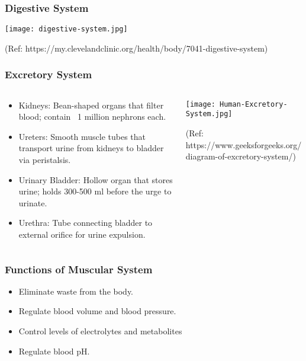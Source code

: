 \begin{frame}[fragile]\frametitle{Digestive System}

		\begin{center}
		\texttt{[image: digestive-system.jpg]}
		
		{\tiny (Ref: https://my.clevelandclinic.org/health/body/7041-digestive-system)}
		\end{center}	

\end{frame}

\begin{frame}[fragile]\frametitle{Excretory System}
\begin{columns}
    \begin{column}[T]{0.5\linewidth}
      \begin{itemize}
		\item Kidneys: Bean-shaped organs that filter blood; contain ~1 million nephrons each.
		\item Ureters: Smooth muscle tubes that transport urine from kidneys to bladder via peristalsis.
		\item Urinary Bladder: Hollow organ that stores urine; holds 300-500 ml before the urge to urinate.
		\item Urethra: Tube connecting bladder to external orifice for urine expulsion.
	  \end{itemize}
    \end{column}
    \begin{column}[T]{0.5\linewidth}
		\begin{center}
		\texttt{[image: Human-Excretory-System.jpg]}
		
		{\tiny (Ref: https://www.geeksforgeeks.org/diagram-of-excretory-system/)}
		\end{center}	
    \end{column}
  \end{columns}
\end{frame}
\begin{frame}[fragile]\frametitle{Functions of Muscular System }

      \begin{itemize}
		\item Eliminate waste from the body.
		\item Regulate blood volume and blood pressure.
		\item Control levels of electrolytes and metabolites
		\item Regulate blood pH.

	  \end{itemize}

\end{frame}

